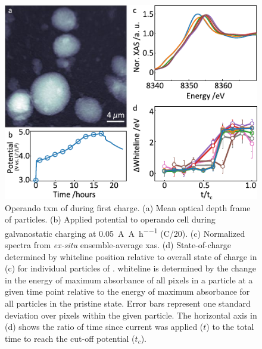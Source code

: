 \documentclass{article}
\begin{document}
\newpage
\begin{figure}[!h]
  \includegraphics{figures/nca_txm.pdf}
  \caption{Operando \gls{txm} of \nca{} during first charge. (a) Mean
    optical depth frame of \nca{} particles. (b) Applied potential to
    operando cell during galvanostatic charging at
    \SI{0.05}{\ampere\per\ampere\per\hour} (C/20). (c) Normalized
    spectra from \emph{ex-situ} ensemble-average \gls{xas}. (d)
    State-of-charge determined by whiteline position relative to
    overall state of charge in (c) for individual particles of
    \nca{}. \textDelta{}whiteline is determined by the change in the
    energy of maximum absorbance of all pixels in a particle at a
    given time point relative to the energy of maximum absorbance for
    all particles in the pristine state. Error bars represent one
    standard deviation over pixels within the given particle. The
    horizontal axis in (d) shows the ratio of time since current was
    applied ($t$) to the total time to reach the cut-off potential
    ($t_c$).}
  \label{fig:txm-nca}
\end{figure}
\end{document}
